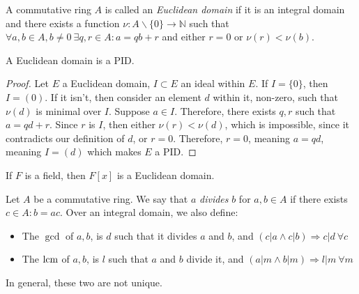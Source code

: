 
\begin{definition}
  A commutative ring $A$ is called an \emph{Euclidean domain} if it is an integral domain and there exists a function $\nu: A \smallsetminus \{0\} \to \mathbb{N}$ such that $\forall a, b \in A, b \neq 0 \ \exists q, r \in A: a = qb + r$ and either $r = 0$ or $\nu(r) < \nu(b)$.
\end{definition}

\begin{theorem*}
  A Euclidean domain is a PID. 
\end{theorem*}
\begin{proof}
  Let $E$ a Euclidean domain, $I \subset E$ an ideal within $E$. If $I = \{0\}$, then $I = (0)$. If it isn't, then consider an element $d$ within it, non-zero, such that $\nu(d)$ is minimal over $I$. Suppose $a \in I$. Therefore, there exists $q, r$ such that $a = qd + r$. Since $r$ is $I$, then either $\nu(r) < \nu(d)$, which is impossible, since it contradicts our definition of $d$, or $r = 0$. Therefore, $r = 0$, meaning $a = qd$, meaning $I = (d)$ which makes $E$ a PID. 
\end{proof}

\begin{theorem}[Unproven] 
  If $F$ is a field, then $F[x]$ is a Euclidean domain. 
\end{theorem}

\begin{definition}
Let $A$ be a commutative ring. We say that $a$ \emph{divides} $b$ for $a, b \in A$ if there exists $c \in A: b = ac$. Over an integral domain, we also define: 
\begin{itemize}
  \item The \emph{$\gcd$} of $a, b$, is $d$ such that it divides $a$ and $b$, and $(c|a \land c|b) \Rightarrow c|d \ \forall c$
  \item The \emph{$\operatorname{lcm}$} of $a, b$, is $l$ such that $a$ and $b$ divide it, and $(a|m \land b|m) \Rightarrow l|m \ \forall m$
\end{itemize} 
In general, these two are not unique. 
\end{definition}

